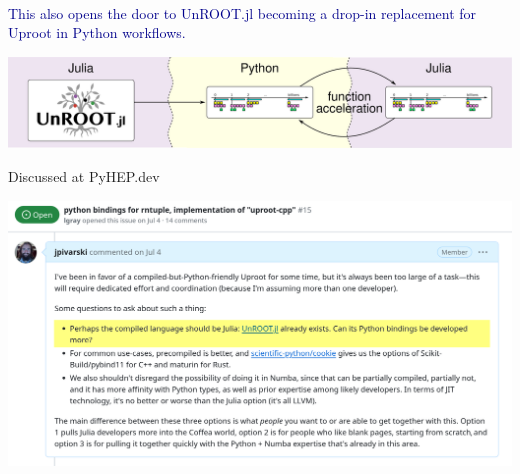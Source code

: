 \documentclass[aspectratio=169]{beamer}
\begin{document}
\begin{frame}{\mbox{ }}
\vspace{1 cm}
\LARGE
\begin{center}
\textcolor{darkblue}{This also opens the door to UnROOT.jl becoming a drop-in replacement for Uproot in Python workflows.}
\end{center}

\vspace{1 cm}
\begin{center}
\includegraphics[width=0.9\linewidth]{backends-usage-patterns-3.pdf}
\end{center}
\end{frame}

\begin{frame}{Discussed at PyHEP.dev}
\vspace{0.35 cm}
\begin{center}
\includegraphics[width=\linewidth]{instead-of-uproot-cpp.png}
\end{center}
\end{frame}
\end{document}
